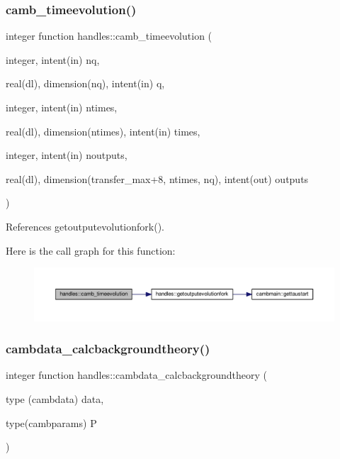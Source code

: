 \mbox{\label{namespacehandles_a0d801cc8883d8e64021e9a4703f5ac63}} 
\subsubsection{\texorpdfstring{camb\+\_\+timeevolution()}{camb\_timeevolution()}}
{\footnotesize\ttfamily integer function handles\+::camb\+\_\+timeevolution (\begin{DoxyParamCaption}\item[{integer, intent(in)}]{nq,  }\item[{real(dl), dimension(nq), intent(in)}]{q,  }\item[{integer, intent(in)}]{ntimes,  }\item[{real(dl), dimension(ntimes), intent(in)}]{times,  }\item[{integer, intent(in)}]{noutputs,  }\item[{real(dl), dimension(transfer\+\_\+max+8, ntimes, nq), intent(out)}]{outputs }\end{DoxyParamCaption})}



References getoutputevolutionfork().

Here is the call graph for this function\+:
\nopagebreak
\begin{figure}[H]
\begin{center}
\leavevmode
\includegraphics[width=350pt]{namespacehandles_a0d801cc8883d8e64021e9a4703f5ac63_cgraph}
\end{center}
\end{figure}
\mbox{\label{namespacehandles_a2c10aa9ff66a25677588584f3fc4f2a3}} 
\subsubsection{\texorpdfstring{cambdata\+\_\+calcbackgroundtheory()}{cambdata\_calcbackgroundtheory()}}
{\footnotesize\ttfamily integer function handles\+::cambdata\+\_\+calcbackgroundtheory (\begin{DoxyParamCaption}\item[{type (cambdata)}]{data,  }\item[{type(cambparams)}]{P }\end{DoxyParamCaption})}



